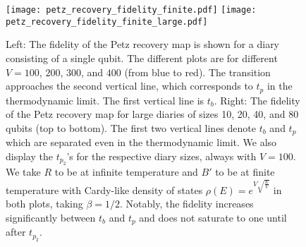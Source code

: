 \documentclass[a4paper,11pt]{article}
\newcommand{\SV}[1]{\textcolor{red}{#1}}
\begin{document}
\begin{enumerate}

\begin{figure}[!h]
	\centering
	\texttt{[image: petz\_recovery\_fidelity\_finite.pdf]}
	\texttt{[image: petz\_recovery\_fidelity\_finite\_large.pdf]}
	\caption{Left: The fidelity of the Petz recovery map is shown for a diary consisting of a single qubit. The different plots are for different $V = 100$, $200$, $300$, and $400$ (from blue to red). The transition approaches the second vertical line, which corresponds to $t_p$ in the thermodynamic limit. The first vertical line is $t_b$. Right: The fidelity of the Petz recovery map for large diaries of sizes 10, 20, 40, and 80 qubits (top to bottom). The first two vertical lines denote $t_b$ and $t_p$ which are separated even in the thermodynamic limit. We also display the $t_{p_2}$'s for the respective diary sizes, always with $V = 100$. We take $R$ to be at infinite temperature and $B'$ to be at finite temperature with Cardy-like density of states $\rho(E) = e^{V\sqrt{\frac{E}{V}}}$ in both plots, taking $\beta = 1/2$. Notably, the fidelity increases significantly between $t_b$ and $t_p$ and does not saturate to one until after $t_{p_2}$.}
	\label{petz_recovery_fidelity_finite.pdf}
\end{figure}


\end{enumerate}
\end{document}
